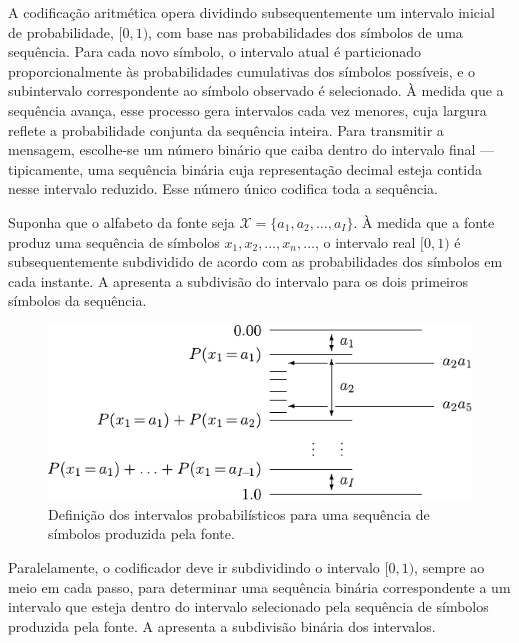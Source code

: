 A codificação aritmética opera dividindo subsequentemente um intervalo inicial
de probabilidade, $[0, 1)$, com base nas probabilidades dos
símbolos de uma sequência. Para cada novo símbolo, o intervalo atual é
particionado proporcionalmente às probabilidades cumulativas dos símbolos
possíveis, e o subintervalo correspondente ao símbolo observado é selecionado.
À medida que a sequência avança, esse processo gera intervalos cada vez
menores, cuja largura reflete a probabilidade conjunta da sequência inteira.
Para transmitir a mensagem, escolhe-se um número binário que caiba dentro do
intervalo final --- tipicamente, uma sequência binária cuja representação
decimal esteja contida nesse intervalo reduzido. Esse número único codifica
toda a sequência.

Suponha que o alfabeto da fonte seja $\mathcal{X} = \{a_1, a_2, \ldots, a_I\}$.
À medida que a fonte produz uma sequência de símbolos $x_1, x_2, \ldots, x_n, \ldots$,
o intervalo real $[0, 1)$ é subsequentemente subdividido de acordo com
as probabilidades dos símbolos em cada instante. A 
apresenta a subdivisão do intervalo para os dois primeiros símbolos da sequência.

\begin{figure}%
  \centering
  \includegraphics[width=0.75\linewidth]{figures/acoding_invervals.pdf}
  \caption{Definição dos intervalos probabilísticos para uma sequência de símbolos produzida pela fonte.}\label{fig:acoding_invervals}
\end{figure}

Paralelamente, o codificador deve ir subdividindo o intervalo $[0, 1)$,
sempre ao meio em cada passo, para determinar uma sequência binária
correspondente a um intervalo que esteja dentro do intervalo selecionado
pela sequência de símbolos produzida pela fonte.
A  apresenta a subdivisão binária dos intervalos.

